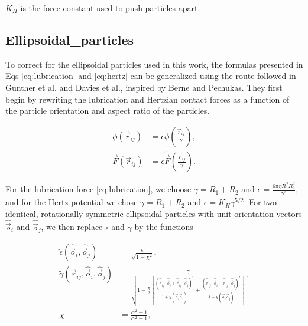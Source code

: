 $K_H$ is the force constant used to push particles apart. 

\subsection{Ellipsoidal_particles}
\label{section:ellipsoidal_particles}

To correct for the ellipsoidal particles used in this work, 
the formulas presented in Eqs \ref{eq:lubrication} and \ref{eq:hertz} can be generalized using the route followed 
in Gunther et al. and Davies et al., inspired by Berne and Pechukas. \cite{gunther_timescales_2014, davies_interface_2014} 
They first begin by rewriting the lubrication and Hertzian contact forces as a function of the particle orientation and 
aspect ratio of the particles.

\begin{equation}
    \begin{split}
    \phi(\vec{r}_{ij}) &= {\epsilon} \tilde{\phi}\left(\frac{\vec{r}_{ij}}{{\gamma}}\right) , \\
    \vec{F}(\vec{r}_{ij}) &= {\epsilon} \tilde{\vec{F}}\left(\frac{\vec{r}_{ij}}{{\gamma}}\right) .
    \end{split}
\end{equation}

For the lubrication force \eqref{eq:lubrication}, we choose
${\gamma}=R_1+R_2$ and ${\epsilon}=\frac{6\pi\eta R_1^2 R_2^2}{{\gamma^3}}$, and for the
Hertz potential we chose ${\gamma}=R_1+R_2$ and ${\epsilon}=K_H\gamma^{5/2}$. For two identical, rotationally
symmetric ellipsoidal particles with unit orientation vectors $\hat{\vec{o}}_i$ and $\hat{\vec{o}}_j$, we then replace $\epsilon$ and $\gamma$ by
the functions

\begin{equation}
    \begin{split}
    \tilde\epsilon\left(\hat{\vec{o}}_i, \hat{\vec{o}}_j\right) &= \frac{{\epsilon}}{\sqrt{1-\chi^2}} , \\
    \tilde\gamma\left(\vec{r}_{ij}, \hat{\vec{o}}_i, \hat{\vec{o}}_j\right) &= \frac{{\gamma}}{\sqrt{1-\frac{\chi}{2}\left[ \frac{\left(\hat{\vec{r}}_{ij}\cdot\hat{\vec{o}}_i+\hat{\vec{r}}_{ij}\cdot\hat{\vec{o}}_j\right)^2}{1+\chi\left(\hat{\vec{o}}_i\hat{\vec{o}}_j\right)} + \frac{\left(\hat{\vec{r}}_{ij}\cdot\hat{\vec{o}}_i-\hat{\vec{r}}_{ij}\cdot\hat{\vec{o}}_j\right)^2}{1-\chi\left(\hat{\vec{o}}_i\hat{\vec{o}}_j\right)} \right] }} , \\
    \chi &= \frac{\alpha^2-1}{\alpha^2+1} , \\
    \end{split}
\end{equation}

